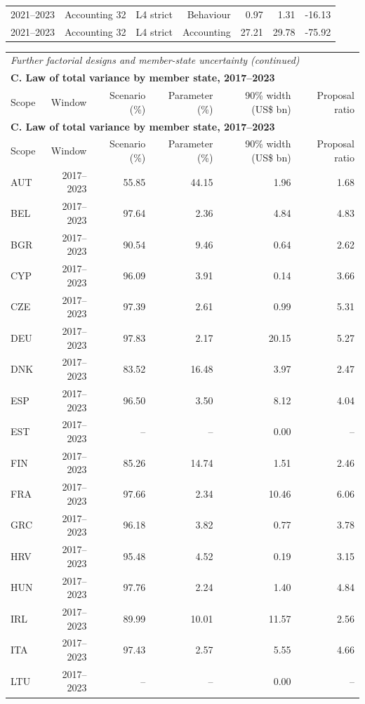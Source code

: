 {\begin{longtable}{@{}lrrrrrr@{}}
2021–2023 & Accounting 32 & L4 strict & Behaviour &  0.97 &  1.31 &  -16.13 \\
2021–2023 & Accounting 32 & L4 strict & Accounting & 27.21 & 29.78 &  -75.92 \\
\end{longtable}
\addtocounter{table}{-1}
\begin{longtable}{@{}lrrrrr@{}}
\multicolumn{6}{l}{\textit{Further factorial designs and member-state uncertainty (continued)}} \\
\multicolumn{6}{l}{\textbf{C. Law of total variance by member state, 2017–2023}} \\
\toprule
Scope & Window & Scenario (\%) & Parameter (\%) & 90\% width (US\$ bn) & Proposal ratio \\
\midrule
\endfirsthead
\multicolumn{6}{l}{\textbf{C. Law of total variance by member state, 2017–2023}} \\
\toprule
Scope & Window & Scenario (\%) & Parameter (\%) & 90\% width (US\$ bn) & Proposal ratio \\
\midrule
\endhead
\midrule
\endfoot
\bottomrule
\endlastfoot
AUT & 2017–2023 & 55.85 & 44.15 &  1.96 &  1.68 \\
BEL & 2017–2023 & 97.64 &  2.36 &  4.84 &  4.83 \\
BGR & 2017–2023 & 90.54 &  9.46 &  0.64 &  2.62 \\
CYP & 2017–2023 & 96.09 &  3.91 &  0.14 &  3.66 \\
CZE & 2017–2023 & 97.39 &  2.61 &  0.99 &  5.31 \\
DEU & 2017–2023 & 97.83 &  2.17 & 20.15 &  5.27 \\
DNK & 2017–2023 & 83.52 & 16.48 &  3.97 &  2.47 \\
ESP & 2017–2023 & 96.50 &  3.50 &  8.12 &  4.04 \\
EST & 2017–2023 & -- & -- &  0.00 & -- \\
FIN & 2017–2023 & 85.26 & 14.74 &  1.51 &  2.46 \\
FRA & 2017–2023 & 97.66 &  2.34 & 10.46 &  6.06 \\
GRC & 2017–2023 & 96.18 &  3.82 &  0.77 &  3.78 \\
HRV & 2017–2023 & 95.48 &  4.52 &  0.19 &  3.15 \\
HUN & 2017–2023 & 97.76 &  2.24 &  1.40 &  4.84 \\
IRL & 2017–2023 & 89.99 & 10.01 & 11.57 &  2.56 \\
ITA & 2017–2023 & 97.43 &  2.57 &  5.55 &  4.66 \\
LTU & 2017–2023 & -- & -- &  0.00 & -- \\

\end{longtable}}
